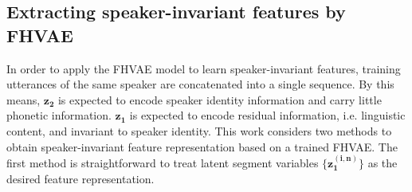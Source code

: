 \documentclass[a4paper]{article}
\begin{document}
\subsection{Extracting speaker-invariant features by FHVAE}
\label{subsec:spk_inv_feat}
In order to apply the FHVAE model to learn speaker-invariant features, 
training utterances of the same speaker are concatenated into a single sequence.
By this means, 
$\bm{z_2}$ is expected to encode speaker identity information and  carry little phonetic information. $\bm{z_1}$ is expected to encode residual information, i.e. linguistic content, and  invariant to speaker identity. 
This work considers two methods to obtain speaker-invariant feature representation based on a trained FHVAE. The first method is straightforward to treat 
latent segment variables $\{\bm{z_1^{(i,n)}}\}$ as the desired  feature representation. 
\end{document}
